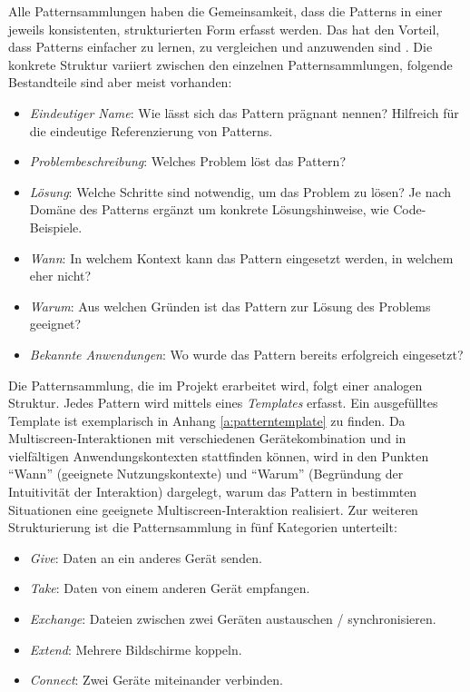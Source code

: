 Alle Patternsammlungen haben die Gemeinsamkeit, dass die Patterns in einer jeweils konsistenten, strukturierten Form erfasst werden. Das hat den Vorteil, dass Patterns einfacher zu lernen, zu vergleichen und anzuwenden sind \citep[6]{Gamma1995}. Die konkrete Struktur variiert zwischen den einzelnen Patternsammlungen, folgende Bestandteile sind aber meist vorhanden:
\begin{itemize}
\item \textit{Eindeutiger Name}: Wie lässt sich das Pattern prägnant nennen? Hilfreich für die eindeutige Referenzierung von Patterns.
\item \textit{Problembeschreibung}: Welches Problem löst das Pattern?
\item \textit{Lösung}: Welche Schritte sind notwendig, um das Problem zu lösen? Je nach Domäne des Patterns ergänzt um konkrete Lösungshinweise, wie \zb Code-Beispiele.
\item \textit{Wann}: In welchem Kontext kann das Pattern eingesetzt werden, in welchem eher nicht?
\item \textit{Warum}: Aus welchen Gründen ist das Pattern zur Lösung des Problems geeignet?
\item \textit{Bekannte Anwendungen}: Wo wurde das Pattern bereits erfolgreich eingesetzt?
\end{itemize}

Die Patternsammlung, die im Projekt \sysplace erarbeitet wird, folgt einer analogen Struktur. Jedes Pattern wird mittels eines \textit{Templates} erfasst. Ein ausgefülltes Template ist exemplarisch in Anhang \ref{a:patterntemplate} zu finden. Da Multiscreen-Interaktionen mit verschiedenen Gerätekombination und in vielfältigen Anwendungskontexten stattfinden können, wird in den Punkten "`Wann"' (geeignete Nutzungskontexte) und "`Warum"' (Begründung der Intuitivität der Interaktion) dargelegt, warum das Pattern in bestimmten Situationen eine geeignete Multiscreen-Interaktion realisiert. Zur weiteren Strukturierung ist die Patternsammlung in fünf Kategorien unterteilt:
\begin{itemize}
\item \textit{Give}: Daten an ein anderes Gerät senden.
\item \textit{Take}: Daten von einem anderen Gerät empfangen.
\item \textit{Exchange}: Dateien zwischen zwei Geräten austauschen / synchronisieren.
\item \textit{Extend}: Mehrere Bildschirme koppeln.
\item \textit{Connect}: Zwei Geräte miteinander verbinden.
\end{itemize}

